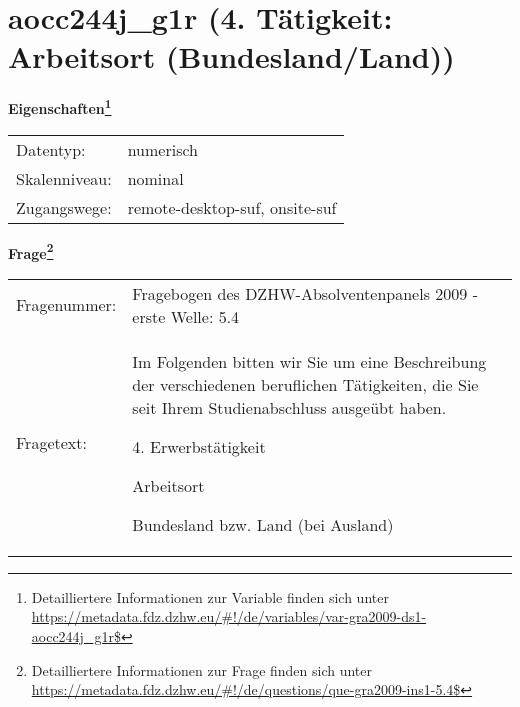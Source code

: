 
    \setcounter{footnote}{0}

    \vspace*{-1.8cm}
	\section{aocc244j\_g1r (4. Tätigkeit: Arbeitsort (Bundesland/Land))}
	\label{section:aocc244j_g1r}



    \vspace*{0.5cm}
    \noindent\textbf{Eigenschaften\footnote{Detailliertere Informationen zur Variable finden sich unter
		\url{https://metadata.fdz.dzhw.eu/\#!/de/variables/var-gra2009-ds1-aocc244j_g1r$}}}\\
	\begin{tabularx}{\hsize}{@{}lX}
	Datentyp: & numerisch \\
	Skalenniveau: & nominal \\
	Zugangswege: &
	  remote-desktop-suf, 
	  onsite-suf
 \\
    \end{tabularx}



				\vspace*{0.5cm}
                \noindent\textbf{Frage\footnote{Detailliertere Informationen zur Frage finden sich unter
		              \url{https://metadata.fdz.dzhw.eu/\#!/de/questions/que-gra2009-ins1-5.4$}}}\\
				\begin{tabularx}{\hsize}{@{}lX}
					Fragenummer: &
					  Fragebogen des DZHW-Absolventenpanels 2009 - erste Welle:
					  5.4
 \\
					Fragetext: & Im Folgenden bitten wir Sie um eine Beschreibung der verschiedenen beruflichen Tätigkeiten, die Sie seit Ihrem Studienabschluss ausgeübt haben.\par  4. Erwerbstätigkeit\par  Arbeitsort\par  Bundesland bzw. Land (bei Ausland) \\
				\end{tabularx}





